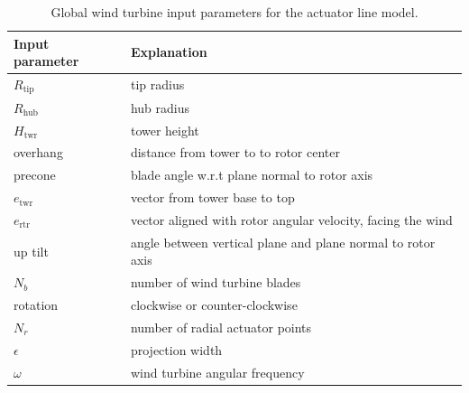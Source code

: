 \begin{table}[H]
	\begin{center}
		\begin{tabular}{l l} 
			\hline
			Input parameter & Explanation \\
			\hline
			$R_\text{tip}$ & tip radius \\
			$R_\text{hub}$ & hub radius \\
			$H_\text{twr}$ & tower height \\
			overhang & distance from tower to to rotor center \\
			precone & blade angle w.r.t plane normal to rotor axis\\
			$e_\text{twr}$ & vector from tower base to top \\
			$e_\text{rtr}$ & vector aligned with rotor angular velocity, facing the wind \\
			up tilt & angle between vertical plane and plane normal to rotor axis \\
			$N_b$ & number of wind turbine blades \\
			rotation & clockwise or counter-clockwise \\
			$N_r$ & number of radial actuator points \\
			$\epsilon$ & projection width \\
			$\omega$ & wind turbine angular frequency \\
			\hline
		\end{tabular}
	\end{center}
	\caption[Input parameters for the actuator line model]{Global wind turbine input parameters for the actuator line model.}
	\label{tab:ALMinput}
\end{table}
 
